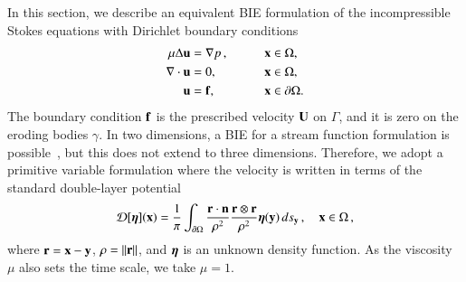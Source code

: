 \documentclass[preprint, 10pt]{elsarticle}
\begin{document}
In this section, we describe an equivalent BIE formulation of the incompressible Stokes equations with Dirichlet boundary conditions
\begin{equation}
  \begin{split}
  \mu\Delta {\mathbf{u}} &= {\nabla} p\, , \qquad && {\mathbf{x}} \in \Omega, \\
  {\nabla} \cdot {\mathbf{u}} &= 0,   && {\mathbf{x}} \in \Omega, \\
  {\mathbf{u}} &= {\mathbf{f}},  && {\mathbf{x}} \in {\partial}\Omega.
  \end{split}
  \label{eqn:stokes}
\end{equation}
The boundary condition ${\mathbf{f}}$ is the prescribed velocity ${\mathbf{U}}$ on
$\Gamma$, and it is zero on the eroding bodies $\gamma$.  In two dimensions, a BIE for a stream function formulation is possible~\cite{gre-kro-may1996}, but this does not extend to three dimensions.  Therefore, we adopt a primitive variable formulation where the velocity is written in terms of the standard double-layer potential~\cite{lad1963,poz1992}
\begin{align}
  {\mathcal{D}}[{\boldsymbol\eta}]({\mathbf{x}}) = \frac{1}{\pi} \int_{{\partial}\Omega} 
    \frac{{\mathbf{r}} \cdot {\mathbf{n}}}{\rho^2} \frac{{\mathbf{r}} \otimes {\mathbf{r}}}{\rho^2} 
    {\boldsymbol\eta}({\mathbf{y}}) \, ds_{\mathbf{y}}\, , \quad {\mathbf{x}} \in \Omega \, ,
    \label{eqn:velocityDLP}
\end{align}
where ${\mathbf{r}} = {\mathbf{x}} - {\mathbf{y}}$, $\rho = \|{\mathbf{r}}\|$, and ${\boldsymbol\eta}$ is an unknown density function.  As the viscosity $\mu$ also sets the time scale, we take $\mu=1$.
\end{document}
